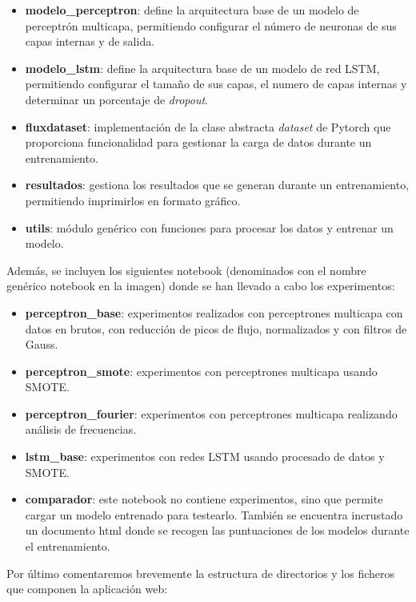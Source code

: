 \begin{itemize}
    \item \textbf{modelo\_perceptron}: define la arquitectura base de un modelo de perceptrón multicapa, permitiendo configurar el número de neuronas de sus capas internas y de salida.
    \item \textbf{modelo\_lstm}: define la arquitectura base de un modelo de red LSTM, permitiendo configurar el tamaño de sus capas, el numero de capas internas y determinar un porcentaje de \textit{dropout}.
    \item \textbf{fluxdataset}: implementación de la clase abstracta \textit{dataset} de Pytorch que proporciona funcionalidad para gestionar la carga de datos durante un entrenamiento.
    \item \textbf{resultados}: gestiona los resultados que se generan durante un entrenamiento, permitiendo imprimirlos en formato gráfico.
    \item \textbf{utils}: módulo genérico con funciones para procesar los datos y entrenar un modelo.
\end{itemize}


Además, se incluyen los siguientes notebook (denominados con el nombre genérico notebook en la imagen) donde se han llevado a cabo los experimentos:

\begin{itemize}
    \item \textbf{perceptron\_base}: experimentos realizados con perceptrones multicapa con datos en brutos, con reducción de picos de flujo, normalizados y con filtros de Gauss.
    \item \textbf{perceptron\_smote}: experimentos con perceptrones multicapa usando SMOTE.
    \item \textbf{perceptron\_fourier}: experimentos con perceptrones multicapa realizando análisis de frecuencias.
    \item \textbf{lstm\_base}: experimentos con redes LSTM usando procesado de datos y SMOTE.
    \item \textbf{comparador}: este notebook no contiene experimentos, sino que permite cargar un modelo entrenado para testearlo. También se encuentra incrustado un documento html donde se recogen las puntuaciones de los modelos durante el entrenamiento.
\end{itemize}

Por último comentaremos brevemente la estructura de directorios y los ficheros que componen la aplicación web:

